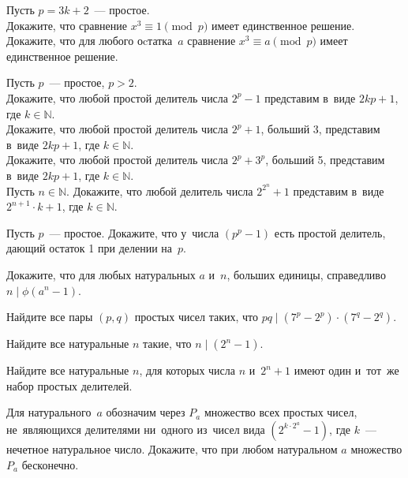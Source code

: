 \begin{problems}

\item
Пусть $p = 3 k + 2$~--- простое.
\\
\subproblem
Докажите, что сравнение $x^3 \equiv 1 \pmod{p}$ имеет единственное решение.
\\
\subproblem
Докажите, что для любого оcтатка~$a$ сравнение $x^3 \equiv a \pmod{p}$ имеет
единственное решение.

\item
Пусть $p$~--- простое, $p > 2$.
\\
\subproblem
Докажите, что любой простой делитель числа $2^p - 1$ представим
в~виде $2 k p + 1$, где $k \in \mathbb{N}$.
\\
\subproblem
Докажите, что любой простой делитель числа $2^p + 1$, больший 3, представим
в~виде $2 k p + 1$, где $k \in \mathbb{N}$.
\\
\subproblem
Докажите, что любой простой делитель числа $2^p + 3^p$, больший 5, представим
в~виде $2 k p + 1$, где $k \in \mathbb{N}$.
\\
\subproblem
Пусть $n \in \mathbb{N}$.
Докажите, что любой делитель числа $2^{2^n} + 1$ представим
в~виде $2^{n+1} \cdot k + 1$, где $k \in \mathbb{N}$.

\item
Пусть $p$~--- простое.
Докажите, что у~числа $(p^p - 1)$ есть простой делитель, дающий остаток 1 при
делении на~$p$.

\item
Докажите, что для любых натуральных $a$ и~$n$, больших единицы, справедливо
$n \mid \phi(a^n - 1)$.

\item
Найдите все пары $(p, q)$ простых чисел таких, что
$p q \mid (7^{p} - 2^{p}) \cdot (7^{q} - 2^{q})$.

\item
Найдите все натуральные $n$ такие, что $n \mid (2^n - 1)$.

\item
Найдите все натуральные $n$, для которых числа $n$ и~$2^n + 1$ имеют один
и~тот~же набор простых делителей. 	

\item
Для натурального~$a$ обозначим через $P_a$ множество всех простых чисел,
не~являющихся делителями ни~одного из~чисел вида $(2^{k \cdot 2^a} - 1)$, где
$k$~--- нечетное натуральное число.
Докажите, что при любом натуральном $a$ множество $P_a$ бесконечно.

\end{problems}

